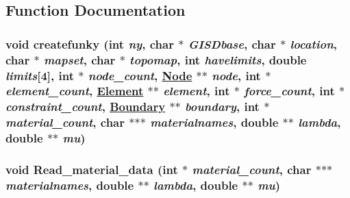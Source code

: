 \subsection{Function Documentation}
\hypertarget{createfunky_8C_a1}{
\subsubsection[createfunky]{\setlength{\rightskip}{0pt plus 5cm}void createfunky (int {\em ny}, char $\ast$ {\em GISDbase}, char $\ast$ {\em location}, char $\ast$ {\em mapset}, char $\ast$ {\em topomap}, int {\em havelimits}, double {\em limits}\mbox{[}4\mbox{]}, int $\ast$ {\em node\_\-count}, \hyperlink{classNode}{Node} $\ast$$\ast$ {\em node}, int $\ast$ {\em element\_\-count}, \hyperlink{classElement}{Element} $\ast$$\ast$ {\em element}, int $\ast$ {\em force\_\-count}, int $\ast$ {\em constraint\_\-count}, \hyperlink{classBoundary}{Boundary} $\ast$$\ast$ {\em boundary}, int $\ast$ {\em material\_\-count}, char $\ast$$\ast$$\ast$ {\em materialnames}, double $\ast$$\ast$ {\em lambda}, double $\ast$$\ast$ {\em mu})}}
\label{createfunky_8C_a1}


\hypertarget{createfunky_8C_a0}{
\subsubsection[Read\_\-material\_\-data]{\setlength{\rightskip}{0pt plus 5cm}void Read\_\-material\_\-data (int $\ast$ {\em material\_\-count}, char $\ast$$\ast$$\ast$ {\em materialnames}, double $\ast$$\ast$ {\em lambda}, double $\ast$$\ast$ {\em mu})}}
\label{createfunky_8C_a0}


